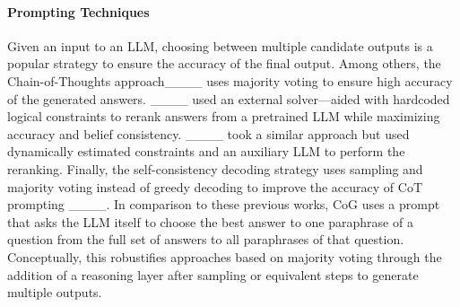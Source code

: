 \paragraph{Prompting Techniques}
Given an input to an LLM, choosing between multiple candidate outputs is a popular strategy to ensure the accuracy of the final output. Among others, the Chain-of-Thoughts approach____ uses majority voting to ensure high accuracy of the generated answers. ____ used an external solver---aided with hardcoded logical constraints to rerank answers from a pretrained LLM while maximizing accuracy and belief consistency. ____ took a similar approach but used dynamically estimated constraints and an auxiliary LLM to perform the reranking. Finally, the self-consistency decoding strategy uses sampling and majority voting instead of greedy decoding to improve the accuracy of CoT prompting ____. In comparison to these previous works, CoG uses a prompt that asks the LLM itself to choose the best answer to one paraphrase of a question from the full set of answers to all paraphrases of that question. Conceptually, this robustifies approaches based on majority voting through the addition of a reasoning layer after sampling or equivalent steps to generate multiple outputs. 


